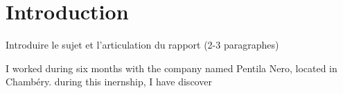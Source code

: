 
\section*{Introduction}
Introduire le sujet et l’articulation du rapport (2-3 paragraphes)

I worked during six months with the company named Pentila Nero, located in Chambéry. 
during this inernship, I have discover  

